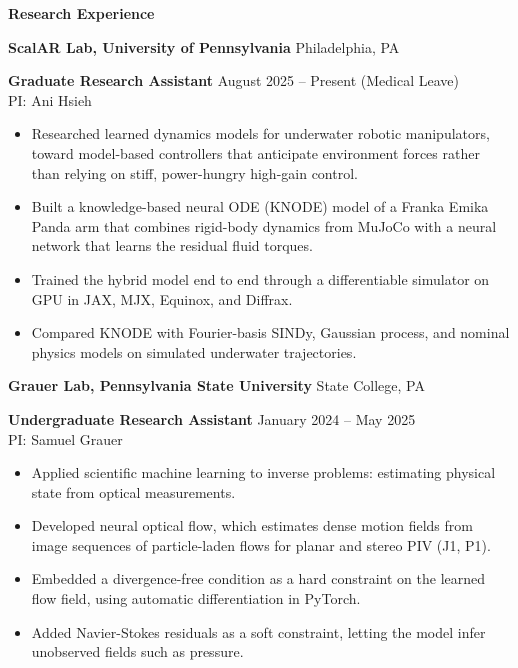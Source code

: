 \begin{center}
    \textbf{Research Experience}
\end{center}
\textbf{ScalAR Lab, University of Pennsylvania} \hfill Philadelphia, PA

\textbf{Graduate Research Assistant} \hfill August 2025 -- Present (Medical Leave)\\
PI: Ani Hsieh
\begin{itemize}[noitemsep, topsep=0pt, partopsep=0pt, parsep=0pt]
    \item Researched learned dynamics models for underwater robotic manipulators, toward model-based controllers that anticipate environment forces rather than relying on stiff, power-hungry high-gain control.

    \item Built a knowledge-based neural ODE (KNODE) model of a Franka Emika Panda arm that combines rigid-body dynamics from MuJoCo with a neural network that learns the residual fluid torques.

    \item Trained the hybrid model end to end through a differentiable simulator on GPU in JAX, MJX, Equinox, and Diffrax.

    \item Compared KNODE with Fourier-basis SINDy, Gaussian process, and nominal physics models on simulated underwater trajectories.
\end{itemize}

\vspace{12pt}

\textbf{Grauer Lab, Pennsylvania State University} \hfill State College, PA

\textbf{Undergraduate Research Assistant} \hfill January 2024 -- May 2025\\
PI: Samuel Grauer
\begin{itemize}[noitemsep, topsep=0pt, partopsep=0pt, parsep=0pt]
    \item Applied scientific machine learning to inverse problems: estimating physical state from optical measurements.

    \item Developed neural optical flow, which estimates dense motion fields from image sequences of particle-laden flows for planar and stereo PIV (J1, P1).

    \item Embedded a divergence-free condition as a hard constraint on the learned flow field, using automatic differentiation in PyTorch.

    \item Added Navier-Stokes residuals as a soft constraint, letting the model infer unobserved fields such as pressure.
\end{itemize}

